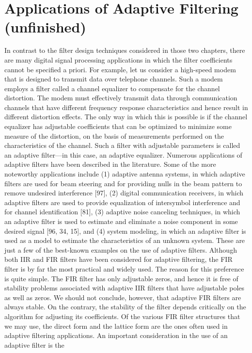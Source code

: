 \documentclass{article}
\begin{document}
\section{Applications of Adaptive Filtering (unfinished)}
In contrast to the filter design techniques considered in those two
chapters, there are many digital signal processing applications in which
the filter coefficients cannot be specified a priori. For example, let us consider a high-speed modem that is designed to transmit data over telephone
channels. Such a modem employs a filter called a channel equalizer to compensate for the channel distortion. The modem must effectively transmit
data through communication channels that have different frequency response characteristics and hence result in different distortion effects. The
only way in which this is possible is if the channel equalizer has adjustable
coefficients that can be optimized to minimize some measure of the distortion, on the basis of measurements performed on the characteristics of
the channel. Such a filter with adjustable parameters is called an adaptive
filter—in this case, an adaptive equalizer. Numerous applications of adaptive filters have been described in the
literature. Some of the more noteworthy applications include (1) adaptive
antenna systems, in which adaptive filters are used for beam steering and
for providing nulls in the beam pattern to remove undesired interference
[97], (2) digital communication receivers, in which adaptive filters are
used to provide equalization of intersymbol interference and for channel identification [81], (3) adaptive noise canceling techniques, in which an
adaptive filter is used to estimate and eliminate a noise component in
some desired signal [96, 34, 15], and (4) system modeling, in which an
adaptive filter is used as a model to estimate the characteristics of an unknown system. These are just a few of the best-known examples on the use
of adaptive filters.
Although both IIR and FIR filters have been considered for adaptive filtering, the FIR filter is by far the most practical and widely used.
The reason for this preference is quite simple. The FIR filter has only
adjustable zeros, and hence it is free of stability problems associated with
adaptive IIR filters that have adjustable poles as well as zeros. We should
not conclude, however, that adaptive FIR filters are always stable. On the
contrary, the stability of the filter depends critically on the algorithm for
adjusting its coefficients.
Of the various FIR filter structures that we may use, the direct form
and the lattice form are the ones often used in adaptive filtering applications. An important consideration in the use of an adaptive filter is the
\end{document}
